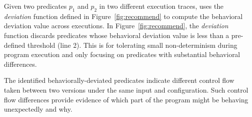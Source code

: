 Given two predicates $p_{1}$ and $p_{2}$ in two different execution traces,
\ourtool uses the \textit{deviation} function defined in Figure~\ref{fig:recommend}
to compute the behavioral deviation value across executions.
In Figure~\ref{fig:recommend}, the \textit{deviation} function
discards predicates whose behavioral deviation value is less than
a pre-defined threshold (line 2). This is for tolerating small non-determinism
during program execution and only focusing on predicates with substantial
behavioral differences.

The identified behaviorally-deviated predicates indicate different
control flow taken between two versions under the same input
and configuration. Such control flow differences provide evidence of
which part of the program might be behaving unexpectedly and why.





